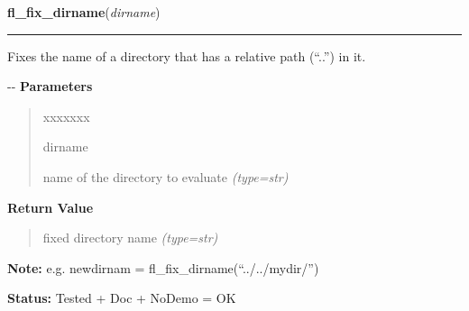 \hspace{.8\funcindent}\begin{boxedminipage}{\funcwidth}

    \raggedright \textbf{fl\_fix\_dirname}(\textit{dirname})

    \vspace{-1.5ex}

    \rule{\textwidth}{0.5\fboxrule}
\setlength{\parskip}{2ex}

Fixes the name of a directory that has a relative path (``..'') in it.

-{}-
\setlength{\parskip}{1ex}
      \textbf{Parameters}
      \vspace{-1ex}

      \begin{quote}
        \begin{Ventry}{xxxxxxx}

          \item[dirname]


name of the directory to evaluate
            {\it (type=str)}

        \end{Ventry}

      \end{quote}

      \textbf{Return Value}
    \vspace{-1ex}

      \begin{quote}

fixed directory name
      {\it (type=str)}

      \end{quote}

\textbf{Note:} 
e.g. newdirnam = fl\_fix\_dirname(``../../mydir/'')


\textbf{Status:} 
Tested + Doc + NoDemo = OK


    \end{boxedminipage}

